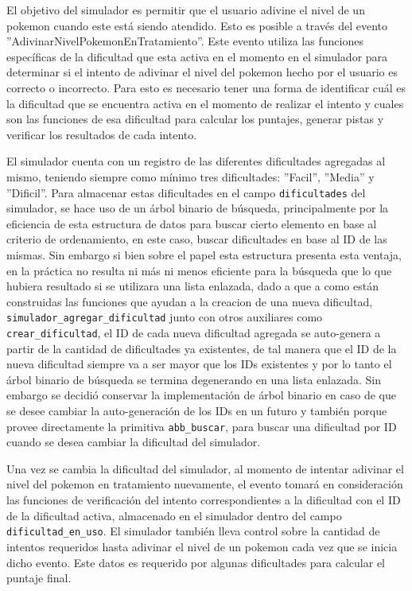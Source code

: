 \documentclass[titlepage,a4paper]{article}
\begin{document}
El objetivo del simulador es permitir que el usuario adivine el nivel de un
pokemon cuando este está siendo atendido. Esto es posible a través del evento
''AdivinarNivelPokemonEnTratamiento''. Este evento utiliza las funciones
específicas de la dificultad que esta activa en el momento en el simulador para
determinar si el intento de adivinar el nivel del pokemon hecho por el usuario
es correcto o incorrecto. Para esto es necesario tener una forma de identificar
cuál es la dificultad que se encuentra activa en el momento de realizar el
intento y cuales son las funciones de esa dificultad para calcular los puntajes, 
generar pistas y verificar los resultados de cada intento.

El simulador cuenta con un registro de las diferentes dificultades agregadas
al mismo, teniendo siempre como mínimo tres dificultades: ''Facil'', ''Media'' y 
''Dificil''. Para almacenar estas dificultades en el campo
\lstinline{dificultades} del simulador, se hace uso de un árbol binario de
búsqueda, principalmente por la eficiencia de esta estructura de datos para
buscar cierto elemento en base al criterio de ordenamiento, en este caso, buscar
dificultades en base al ID de las mismas. Sin embargo si bien sobre el papel
esta estructura presenta esta ventaja, en la práctica no resulta ni más ni
menos eficiente para la búsqueda que lo que hubiera resultado si se utilizara
una lista enlazada, dado a que a como están construidas las funciones que ayudan
a la creacion de una nueva dificultad, \lstinline{simulador_agregar_dificultad}
junto con otros auxiliares como \lstinline{crear_dificultad}, el ID de cada
nueva dificultad agregada se auto-genera a partir de la cantidad de dificultades
ya existentes, de tal manera que el ID de la nueva dificultad siempre va a ser
mayor que los IDs existentes y por lo tanto el árbol binario de búsqueda se 
termina degenerando en una lista enlazada. Sin embargo se decidió conservar la
implementación de árbol binario en caso de que se desee cambiar la
auto-generación de los IDs en un futuro y también porque provee directamente
la primitiva \lstinline{abb_buscar}, para buscar una dificultad por ID cuando se 
desea cambiar la dificultad del simulador.

Una vez se cambia la dificultad del simulador, al momento de intentar adivinar
el nivel del pokemon en tratamiento nuevamente, el evento tomará en consideración
las funciones de verificación del intento correspondientes a la dificultad con
el ID de la dificultad activa, almacenado en el simulador dentro del campo
\lstinline{dificultad_en_uso}. El simulador también lleva control sobre la
cantidad de intentos requeridos hasta adivinar el nivel de un pokemon cada vez
que se inicia dicho evento. Este datos es requerido por algunas dificultades
para calcular el puntaje final.
\end{document}
